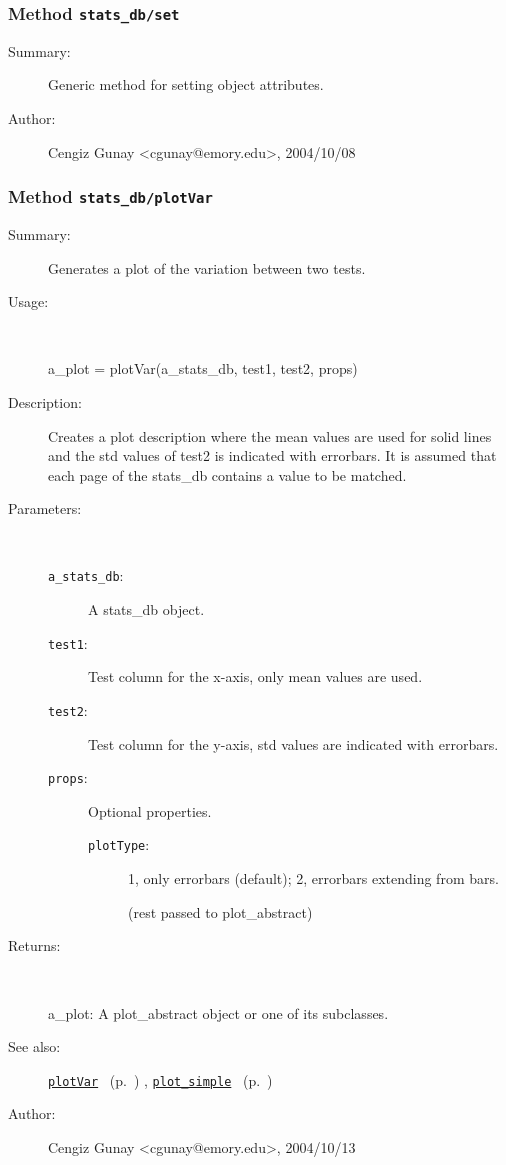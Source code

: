 \subsubsection[Method \texttt{set}]{Method \texttt{stats\_db/set}}%
%
\label{ref_stats_db__set}%
\hypertarget{ref_stats_db__set}{}%
\begin{description}
\item[Summary:]Generic method for setting object attributes.
%
%
%
%
%
%
%
\item[Author:]%
Cengiz Gunay <cgunay@emory.edu>, 2004/10/08%
\end{description}
\methodline%
\subsubsection[Method \texttt{plotVar}]{Method \texttt{stats\_db/plotVar}}%
%
\label{ref_stats_db__plotVar}%
\hypertarget{ref_stats_db__plotVar}{}%
\begin{description}
\item[Summary:]Generates a plot of the variation between two tests.
%
\item[Usage:]~%
\begin{lyxcode}%
a\_plot = plotVar(a\_stats\_db, test1, test2, props)
%
\end{lyxcode}%
%
\item[Description:]%
Creates a plot description where the mean values are used for solid lines
 and the std values of test2 is indicated with errorbars. It is assumed that 
 each page of the stats\_db contains a value to be matched.
\item[Parameters:]~
\begin{description}%
\item[\texttt{a\_stats\_db}:]
 A stats\_db object.
\item[\texttt{test1}:]
 Test column for the x-axis, only mean values are used.
\item[\texttt{test2}:]
 Test column for the y-axis, std values are indicated with errorbars.
\item[\texttt{props}:]
 Optional properties.
\begin{description}%
\item[\texttt{plotType}:]
 1, only errorbars (default); 2, errorbars extending from bars.

(rest passed to plot\_abstract)\end{description}%
\end{description}%
%
\item[Returns:]~

	a\_plot: A plot\_abstract object or one of its subclasses.
%
%
\item[See also:]%
\hyperlink{ref_plotVar}{\texttt{plotVar}}%
\ (p.~\pageref{ref_plotVar})%
%
, \hyperlink{ref_plot_simple}{\texttt{plot\_simple}}%
\ (p.~\pageref{ref_plot_simple})%
%
%
\item[Author:]%
Cengiz Gunay <cgunay@emory.edu>, 2004/10/13%
\end{description}
\methodline%
